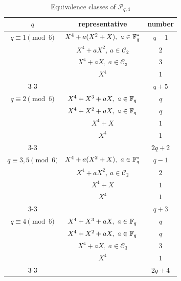 \documentclass{amsart}
\numberwithin{equation}{section}
\theoremstyle{definition}
\newcommand{\f}{\Bbb F}
\begin{document}
\begin{table}[h]
\caption{Equivalence classes of $\mathcal P_{q,4}$}\label{Tb-q4}
   \renewcommand*{\arraystretch}{1.2}
    \centering
     \begin{tabular}{c|c|c}
     \hline
     	$q$ & representative & number \\ \hline      
        $q\equiv 1\pmod 6$ & $X^4+a(X^2+X),\ a\in\f_q^*$ & $q-1$  \\ 
        & $X^4+aX^2,\ a\in\mathcal C_2$ & $2$ \\ 
        & $X^4+aX,\ a\in\mathcal C_3$ & $3$ \\
        & $X^4$ & $1$ \\  \cline{3-3} 
        & & $q+5$  \\  \hline
        $q\equiv 2\pmod 6$ & $X^4+X^3+aX,\ a\in\f_q$ & $q$  \\
        & $X^4+X^2+aX,\ a\in\f_q$ & $q$  \\
        & $X^4+X$ & $1$ \\
        & $X^4$ & $1$ \\ \cline{3-3}
        & & $2q+2$ \\  \hline
        $q\equiv 3,5\pmod 6$ & $X^4+a(X^2+X),\ a\in\f_q^*$ & $q-1$  \\ 
        & $X^4+aX^2,\ a\in\mathcal C_2$ & $2$ \\ 
        & $X^4+X$ & $1$ \\
        & $X^4$ & $1$ \\  \cline{3-3} 
        & & $q+3$  \\  \hline
        $q\equiv 4\pmod 6$ &  $X^4+X^3+aX,\ a\in\f_q$ & $q$  \\
        & $X^4+X^2+aX,\ a\in\f_q$ & $q$  \\
        & $X^4+aX,\ a\in\mathcal C_3$ & $3$ \\
        & $X^4$ & $1$ \\  \cline{3-3}
        & & $2q+4$ \\  \hline 
    \end{tabular}
\end{table}
\end{document}
